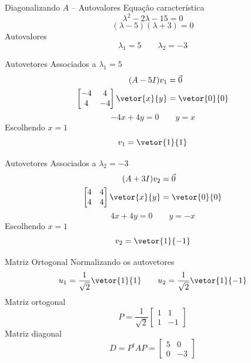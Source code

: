 \begin{resolution}{Diagonalizando $A$ -- Autovalores}
  Equação característica
  \[
    \lambda^2-2\lambda-15=0
  \]
  \[
    (\lambda-5)(\lambda+3)=0
  \]
  Autovalores
  \[
    \lambda_1=5
    \qquad
    \lambda_2=-3
  \]
\end{resolution}

\begin{resolution}{Autovetores Associados a $\lambda_1=5$}
  \begin{align*}
    (A-5I)v_1 & = \vec{0} \\
    \begin{bmatrix}
      -4&4\\
      4&-4
    \end{bmatrix}
    \vetor{x}{y}
    & = \vetor{0}{0}
  \end{align*}
  \[
    -4x+4y=0
    \qquad
    y=x
  \]
  Escolhendo \(x=1\)
  \[
    v_1=\vetor{1}{1}
  \]
\end{resolution}

\begin{resolution}{Autovetores Associados a $\lambda_2=-3$}
  \begin{align*}
    (A+3I)v_2 & = \vec{0} \\
    \begin{bmatrix}
      4&4\\
      4&4
    \end{bmatrix}
    \vetor{x}{y}
    & = \vetor{0}{0}
  \end{align*}
  \[
    4x+4y=0
    \qquad
    y=-x
  \]
  Escolhendo \(x=1\)
  \[
    v_2=\vetor{1}{-1}
  \]
\end{resolution}

\begin{resolution}{Matriz Ortogonal}
  Normalizando os autovetores
  \[
    u_1=\frac{1}{\sqrt{2}}\vetor{1}{1}
    \qquad
    u_2=\frac{1}{\sqrt{2}}\vetor{1}{-1}
  \]
  Matriz ortogonal
  \[
    P=\frac{1}{\sqrt{2}}
    \begin{bmatrix}
      1&1\\
      1&-1
    \end{bmatrix}
  \]
  Matriz diagonal
  \[
    D=P^tAP
    =\begin{bmatrix}
      5&0\\
      0&-3
    \end{bmatrix}
  \]
\end{resolution}

